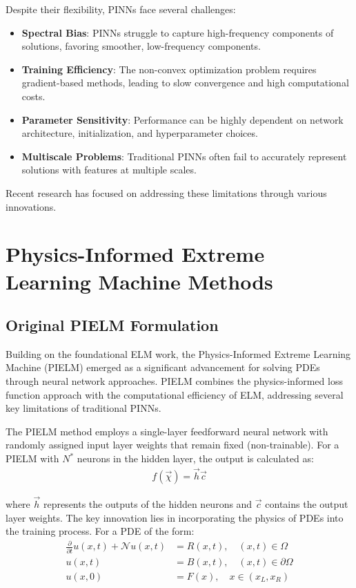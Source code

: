 \documentclass[11pt]{article}
\begin{document}
Despite their flexibility, PINNs face several challenges:
\begin{itemize}
    \item \textbf{Spectral Bias}: PINNs struggle to capture high-frequency components of solutions, favoring smoother, low-frequency components.
    
    \item \textbf{Training Efficiency}: The non-convex optimization problem requires gradient-based methods, leading to slow convergence and high computational costs.
    
    \item \textbf{Parameter Sensitivity}: Performance can be highly dependent on network architecture, initialization, and hyperparameter choices.
    
    \item \textbf{Multiscale Problems}: Traditional PINNs often fail to accurately represent solutions with features at multiple scales.
\end{itemize}

Recent research has focused on addressing these limitations through various innovations.

\section{Physics-Informed Extreme Learning Machine Methods}

\subsection{Original PIELM Formulation}

Building on the foundational ELM work, the Physics-Informed Extreme Learning Machine (PIELM) \citep{Dwivedi2020a} emerged as a significant advancement for solving PDEs through neural network approaches. PIELM combines the physics-informed loss function approach with the computational efficiency of ELM, addressing several key limitations of traditional PINNs.

The PIELM method employs a single-layer feedforward neural network with randomly assigned input layer weights that remain fixed (non-trainable). For a PIELM with $N^*$ neurons in the hidden layer, the output is calculated as:
\begin{align}
f(\vec{\chi}) = \vec{h}\vec{c}
\end{align}

where $\vec{h}$ represents the outputs of the hidden neurons and $\vec{c}$ contains the output layer weights. The key innovation lies in incorporating the physics of PDEs into the training process. For a PDE of the form:
\begin{align}
\frac{\partial}{\partial t}u(x,t) + \mathcal{N}u(x,t) &= R(x,t), \quad (x,t) \in \Omega\\
u(x,t) &= B(x,t), \quad (x,t) \in \partial\Omega\\
u(x,0) &= F(x), \quad x \in (x_L, x_R)
\end{align}
\end{document}
